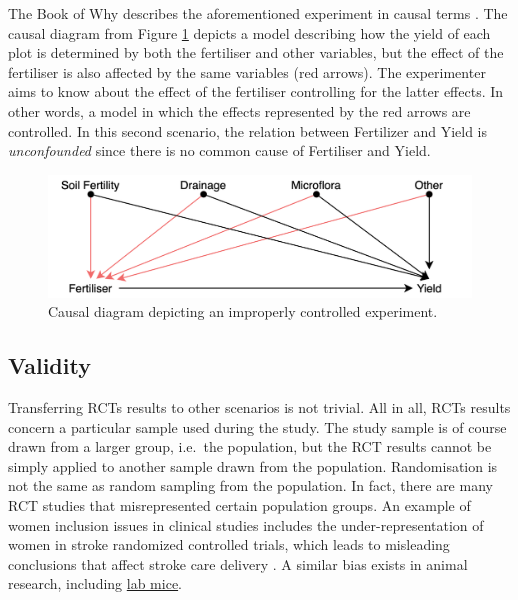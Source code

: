 \documentclass[
]{book}
\begin{document}
The Book of Why describes the aforementioned experiment in causal terms \citep{book-of-why}. The causal diagram from Figure \ref{fig:rct-diagram} depicts a model describing how the yield of each plot is determined by both the fertiliser and other variables, but the effect of the fertiliser is also affected by the same variables (red arrows). The experimenter aims to know about the effect of the fertiliser controlling for the latter effects. In other words, a model in which the effects represented by the red arrows are controlled. In this second scenario, the relation between Fertilizer and Yield is \emph{unconfounded} since there is no common cause of Fertiliser and Yield.

\begin{figure}

{\centering \includegraphics[width=1\linewidth]{Figures/RCT-causal-diagram} 

}

\caption{Causal diagram depicting an improperly controlled experiment.}\label{fig:rct-diagram}
\end{figure}

\hypertarget{validity}{%
\subsection{Validity}\label{validity}}

Transferring RCTs results to other scenarios is not trivial. All in all, RCTs results concern a particular sample used during the study. The study sample is of course drawn from a larger group, i.e.~the population, but the RCT results cannot be simply applied to another sample drawn from the population. Randomisation is not the same as random sampling from the population. In fact, there are many RCT studies that misrepresented certain population groups. An example of women inclusion issues in clinical studies includes the under-representation of women in stroke randomized controlled trials, which leads to misleading conclusions that affect stroke care delivery \citep{tsivgoulis2017under}. A similar bias exists in animal research, including \href{https://www.wired.com/2016/07/science-huge-diversity-problem-lab-rats/}{lab mice}.
\end{document}
